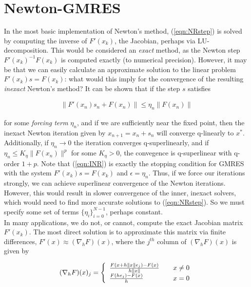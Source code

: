 \documentclass[11pt]{article}
\begin{document}
\section{Newton-GMRES}

In the most basic implementation of Newton's method, (\ref{eqn:NRstep}) is solved by computing the inverse of $F'(x_k)$, the Jacobian, perhaps via LU-decomposition. This would be considered an \textit{exact} method, as the Newton step $F'(x_k)^{-1}F(x_k)$ is computed exactly (to numerical precision). However, it may be that we can easily calculate an approximate solution to the linear problem $F'(x_k)s = F(x_k)$: what would this imply for the convergence of the resulting \textit{inexact} Newton's method? It can be shown that if the step $s$ satisfies

\begin{align}
\label{eqn:INR}
\| F'(x_n)s_n + F(x_n) \| \leq \eta_n \| F(x_n) \|
\end{align}

for some \textit{forcing term} $\eta_n$, and if we are sufficiently near the fixed point, then the inexact Newton iteration given by $x_{n+1} = x_n + s_n$ will converge q-linearly to $x^*$. Additionally, if $\eta_n \rightarrow 0$ the iteration converges q-superlinearly, and if $\eta_n \leq K_\eta \| F(x_n) \|^p$ for some $K_\eta > 0$, the convegence is q-superlinear with q-order $1 + p$. Note that (\ref{eqn:INR}) is exactly the stopping condition for GMRES with the system $F'(x_k) s = F(x_k)$ and $\epsilon = \eta_n$. Thus, if we force our iterations strongly, we can achieve superlinear convergence of the Newton iterations. However, this would result in slower convergence of the inner, inexact solvers, which would need to find more accurate solutions to (\ref{eqn:NRstep}). So we must specify some set of terms $\{ \eta_i \}_{i=0}^{N-1}$, perhaps constant. \\

In many applications, we do not, or cannot, compute the exact Jacobian matrix $F'(x_k)$. The most direct solution is to approximate this matrix via finite differences, $F'(x) \approx (\nabla_hF)(x)$, where the $j^{th}$ column of $(\nabla_hF)(x)$ is given by

\begin{align*}
  (\nabla_hF)(x)_j = \left \{ \begin{array}{l l} \frac{F(x + h\|x \| e_j) - F(x)}{h \|x \|} & \quad x \neq 0 \\ \frac{F(h e_j) - F(x)}{h} & \quad x = 0 \end{array} \right.
\end{align*}
\end{document}
